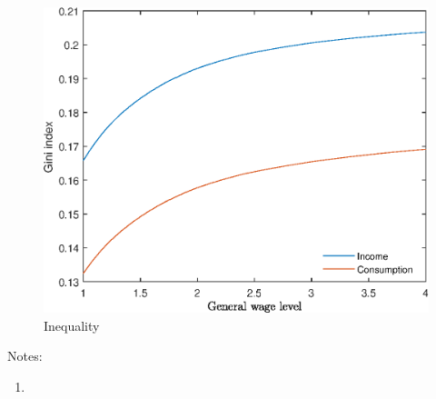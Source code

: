 \documentclass[12pt]{article}
\begin{document}
\begin{figure}
	\centering
	\caption{Inequality}
	\includegraphics{Graphs/ineq_general_wage_ex1.eps}
\end{figure}

Notes:

\begin{enumerate}
	\item 
\end{enumerate}

\clearpage
\end{document}
